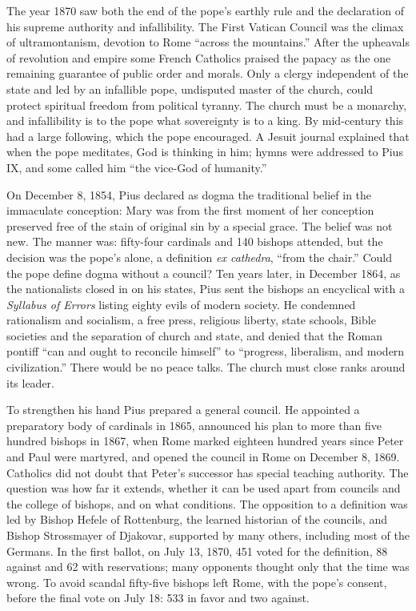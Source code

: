 The year 1870 saw both the end of the pope's earthly rule and the declaration of his supreme
authority and infallibility. The First Vatican Council was the climax of ultramontanism, devotion to
Rome ``across the mountains.'' After the upheavals of revolution and empire some French Catholics
praised the papacy as the one remaining guarantee of public order and morals. Only a clergy independent
of the state and led by an infallible pope, undisputed master of the church, could protect spiritual
freedom from political tyranny. The church must be a monarchy, and infallibility is to the pope what
sovereignty is to a king. By mid-century this had a large following, which the pope encouraged. A
Jesuit journal explained that when the pope meditates, God is thinking in him; hymns were addressed
to Pius IX, and some called him ``the vice-God of humanity.''

On December 8, 1854, Pius declared as dogma the traditional belief in the immaculate conception:
Mary was from the first moment of her conception preserved free of the stain of original sin by a special grace. The belief was not new. The manner was: fifty-four cardinals and 140 bishops attended,
but the decision was the pope's alone, a definition \emph{ex cathedra}, ``from the chair.'' Could the
pope define dogma without a council? Ten years later, in December 1864, as the nationalists closed in
on his states, Pius sent the bishops an encyclical with a \emph{Syllabus of Errors} listing eighty
evils of modern society. He condemned rationalism and socialism, a free press, religious liberty, state schools, Bible societies and the separation of church and state, and denied that the
Roman pontiff ``can and ought to reconcile himself'' to ``progress, liberalism, and modern
civilization.'' There would be no peace talks. The church must close ranks around its leader.

To strengthen his hand Pius prepared a general council. He appointed a preparatory body of cardinals
in 1865, announced his plan to more than five hundred bishops in 1867, when Rome marked eighteen hundred years since Peter and Paul were martyred, and opened the council in Rome on December 8, 1869.
Catholics did not doubt that Peter's successor has special teaching authority. The question was how
far it extends, whether it can be used apart from councils and the college of bishops, and on what
conditions. The opposition to a definition was led by Bishop Hefele of Rottenburg, the learned
historian of the councils, and Bishop Strossmayer of Djakovar, supported by many others, including
most of the Germans. In the first ballot, on July 13, 1870, 451 voted for the definition, 88 against
and 62 with reservations; many opponents thought only that the time was wrong. To avoid scandal
fifty-five bishops left Rome, with the pope's consent, before the final vote on July 18: 533 in
favor and two against.

